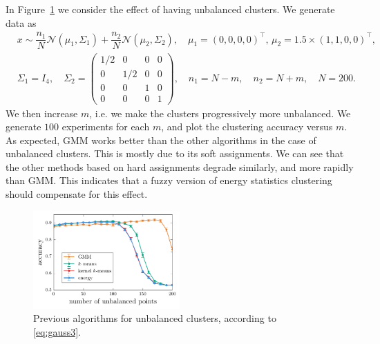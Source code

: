 \documentclass[aps,preprint,nofootinbib,floatfix]{revtex4-1}
\begin{document}
In Figure~\ref{fig:unbalanced} we consider the effect of having 
unbalanced clusters. We generate data as
\begin{equation}
\label{eq:gauss3}
\begin{split}
&x \sim  
\dfrac{n_1}{N} \mathcal{N}(\mu_1,\Sigma_1) + 
\dfrac{n_2}{N} \mathcal{N}(\mu_2, \Sigma_2), 
\quad \mu_1 = (0,0,0,0)^\top , \,
\mu_2 = 1.5\times (1,1,0,0)^\top, \\
&
\Sigma_1 = I_4, \quad
\Sigma_2 = \left( 
\begin{smallmatrix} 
1/2 & 0 & 0 & 0\\
0 & 1/2 & 0 & 0 \\
0 & 0 & 1 & 0 \\
0 & 0 & 0 & 1 
\end{smallmatrix}\right), \quad
n_1 = N - m, \quad  n_2 = N + m, \quad N=200.
\end{split}
\end{equation}
We then increase $m$, i.e. we make the clusters progressively more unbalanced.
We generate $100$ experiments for each $m$, and plot the clustering accuracy
versus $m$.
As expected, GMM
works better than the other algorithms in the case of unbalanced clusters. 
This is mostly due to its soft assignments.
We can see that the other methods based on hard assignments degrade similarly,
and  more rapidly than GMM. This indicates that a fuzzy version of
energy statistics clustering should compensate for this effect.

\begin{figure}
\centering
\includegraphics[width=0.5\textwidth]{gauss_pi.pdf}
\caption{
\label{fig:unbalanced}
Previous algorithms for unbalanced clusters, 
according to \eqref{eq:gauss3}.}
\end{figure}
\end{document}
